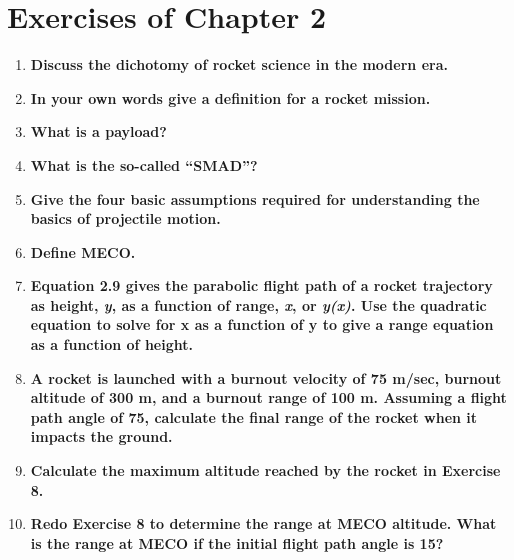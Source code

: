 \section{Exercises of Chapter 2}

\begin{enumerate}

	\item {\bf Discuss the dichotomy of rocket science in the modern era.}\\
	
	\item {\bf In your own words give a definition for a rocket mission.}\\
	
	\item {\bf What is a payload?}\\
	
	\item {\bf What is the so-called “SMAD”?}\\
	
	\item {\bf Give the four basic assumptions required for understanding the basics of projectile motion.}\\
	
	\item {\bf Define MECO.}\\
	
	\item {\bf Equation 2.9 gives the parabolic flight path of a rocket trajectory as height, \textit{y}, as a function of range, \textit{x}, or \textit{y(x)}. Use the quadratic equation to solve for x as a function of y to give a range equation as a function of height.}\\
	
	\item {\bf A rocket is launched with a burnout velocity of 75 m/sec, burnout altitude of 300 m, and a burnout range of 100 m. Assuming a flight path angle of 75\degree, calculate the final range of the rocket when it impacts the ground.}\\
	
	\item {\bf Calculate the maximum altitude reached by the rocket in Exercise 8.}\\

	\item {\bf Redo Exercise 8 to determine the range at MECO altitude. What is the range at MECO if the initial flight path angle is 15\degree ?}\\
	
\end{enumerate}